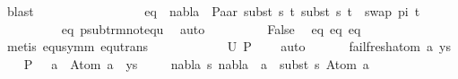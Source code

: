 \begin{isabellebody}
\ blast\isanewline
\ \ \ \ \ \ \isamarkupfalse%
\ \ \isanewline
\ \ \ \ \ \ \isamarkupfalse%
\ eq{}{\isacharcolon}{\kern0pt}\ {\isachardoublequoteopen}{\isasymnot}\ nabla\ {\isasymturnstile}\ {\isacharparenleft}{\kern0pt}Paar\ {\isacharparenleft}{\kern0pt}subst\ s\ t{}{\isacharparenright}{\kern0pt}\ {\isacharparenleft}{\kern0pt}subst\ s\ t{}{\isacharparenright}{\kern0pt}{\isacharparenright}{\kern0pt}\ {\isasymapprox}\ swap\ pi{\isacharprime}{\kern0pt}\ t{\isacharprime}{\kern0pt}{\isachardoublequoteclose}\isanewline
\ \ \ \ \ \ \ \ \isamarkupfalse%
\ eq{}\ psub{\isacharunderscore}{\kern0pt}trm{\isacharunderscore}{\kern0pt}not{\isacharunderscore}{\kern0pt}equ\ \isamarkupfalse%
\ auto\isanewline
\ \ \ \ \ \ \isamarkupfalse%
\ \isamarkupfalse%
\ {\isachardoublequoteopen}False{\isachardoublequoteclose}\ \isamarkupfalse%
\ eq{}\ eq{}\ eq{}\isanewline
\ \ \ \ \ \ \ \ \isamarkupfalse%
\ {\isacharparenleft}{\kern0pt}metis\ equ{\isacharunderscore}{\kern0pt}symm\ equ{\isacharunderscore}{\kern0pt}trans{\isacharparenright}{\kern0pt}\isanewline
\ \ \ \ \isakeywordONE{{\isacharbraceright}{\kern0pt}}\isamarkupfalse%
\isanewline
\ \ \ \ \isamarkupfalse%
\ \isamarkupfalse%
\ {\isachardoublequoteopen}U\ {\isacharquery}{\kern0pt}P\ {\isacharequal}{\kern0pt}\ {\isacharbraceleft}{\kern0pt}{\isacharbraceright}{\kern0pt}{\isachardoublequoteclose}\ \isamarkupfalse%
\ auto\isakeywordONE{{\isacharbraceright}{\kern0pt}}\isamarkupfalse%
\isanewline
\ \ \isamarkupfalse%
\isanewline
{}\isamarkupfalse%
\isanewline
\ \ \isamarkupfalse%
\ {\isacharparenleft}{\kern0pt}fail{\isacharunderscore}{\kern0pt}fresh{\isacharunderscore}{\kern0pt}atom\ a\ ys{\isacharparenright}{\kern0pt}\isanewline
\ \ \isamarkupfalse%
\ {\isacharquery}{\kern0pt}P\ {\isacharequal}{\kern0pt}\ {\isachardoublequoteopen}{\isacharparenleft}{\kern0pt}{\isacharbrackleft}{\kern0pt}{\isacharbrackright}{\kern0pt}{\isacharcomma}{\kern0pt}\ a\ {\isasymsharp}{\isacharquery}{\kern0pt}\ Atom\ a\ {\isacharhash}{\kern0pt}\ ys{\isacharparenright}{\kern0pt}{\isachardoublequoteclose}\isanewline
\ \ \isamarkupfalse%
\ {\isachardoublequoteopen}{\isasymnexists}\ nabla\ s{\isachardot}{\kern0pt}\ nabla\ {\isasymturnstile}\ a\ {\isasymsharp}\ subst\ s\ {\isacharparenleft}{\kern0pt}Atom\ a{\isacharparenright}{\kern0pt}{\isachardoublequoteclose}\isanewline

\end{isabellebody}
